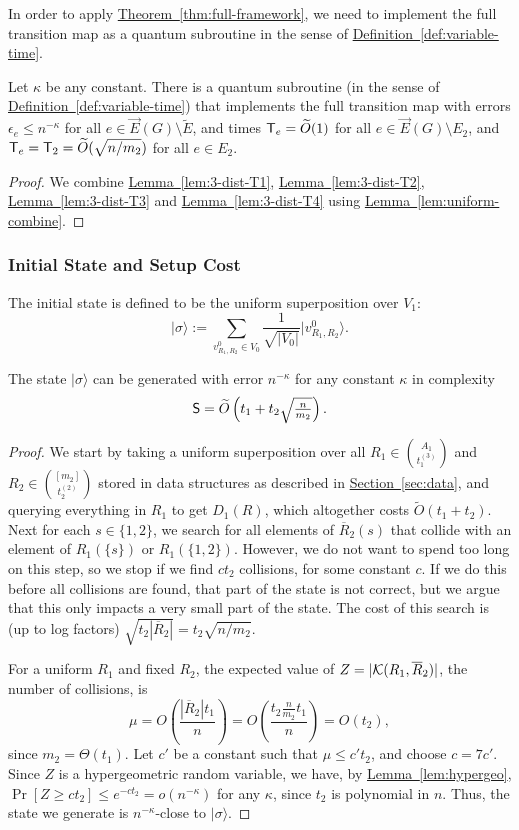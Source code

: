 \documentclass{theoretics}
\renewcommand{\sec}[1]{\hyperref[sec:#1]{Section~\ref*{sec:#1}}}
\newcommand{\thm}[1]{\hyperref[thm:#1]{Theorem~\ref*{thm:#1}}}
\newcommand{\lem}[1]{\hyperref[lem:#1]{Lemma~\ref*{lem:#1}}}
\newcommand{\defin}[1]{\hyperref[def:#1]{Definition~\ref*{def:#1}}}
\def\ket#1{{\lvert}#1\rangle}
\renewcommand{\>}{\rangle}
\newcommand{\<}{\langle}
\renewcommand{\(}{\left(}
\renewcommand{\)}{\right)}
\begin{document}
In order to apply \thm{full-framework}, we need to implement the full transition map as a quantum subroutine in the sense of \defin{variable-time}.
\begin{corollary}\label{cor:3-dist-transitions}
Let $\kappa$ be any constant. 
There is a quantum subroutine (in the sense of \defin{variable-time}) that implements the full transition map with errors $\epsilon_e\leq n^{-\kappa}$ for all $e\in \overrightarrow{E}(G)\setminus\tilde{E}$, and times ${\sf T}_e=\widetilde{O}(1)$ for all $e\in \overrightarrow{E}(G)\setminus E_2$, and ${\sf T}_e={\sf T}_2=\widetilde{O}(\sqrt{n/m_2})$ for all $e\in E_2$. 
\end{corollary}
\begin{proof}
We combine \lem{3-dist-T1}, \lem{3-dist-T2}, \lem{3-dist-T3} and \lem{3-dist-T4} using  \lem{uniform-combine}.
\end{proof}

\subsubsection{Initial State and Setup Cost}


The initial state is defined to be the uniform superposition over $V_1$: 
\begin{equation*}
\ket{\sigma} := \sum_{v^0_{R_1,R_2}\in V_0}\frac{1}{\sqrt{|V_0|}}\ket{v^0_{R_1,R_2}}.
\end{equation*}

\begin{lemma}\label{lem:setup}
The state $\ket{\sigma}$ can be generated with error $n^{-\kappa}$ for any constant $\kappa$ in complexity 
$$\textstyle{\sf S}=\widetilde{O}\left(t_1+t_2\sqrt{\frac{n}{m_2}}\right).$$
\end{lemma}
\begin{proof}
We start by taking a uniform superposition over all $R_1\in \binom{A_1}{t_1^{(3)}}$ and $R_2\in \binom{[m_2]}{t_2^{(2)}}$ stored in data structures as described in \sec{data}, and querying everything in $R_1$ to get $D_1(R)$, which altogether costs $\widetilde{O}(t_1+t_2)$. Next for each $s\in\{1,2\}$, we search for all elements of $\overline{R}_2(s)$ that collide with an element of $R_1(\{s\})$ or $R_1(\{1,2\})$. However, we do not want to spend too long on this step, so we stop if we find $ct_2$ collisions, for some constant $c$. If we do this before all collisions are found, that part of the state is not correct, but we argue that this only impacts a very small part of the state. The cost of this search is (up to log factors) $\sqrt{t_2|\overline{R}_2|}=t_2\sqrt{n/m_2}$. 

For a uniform $R_1$ and fixed $R_2$, the expected value of $Z=|{\cal K}({R}_1,\overline{R}_2)|$, the number of collisions, is 
$$\mu=O\left(\frac{|\overline{R}_2| t_1}{n}\right) = O\left(\frac{t_2\frac{n}{m_2}  t_1}{n}\right)=O(t_2),$$
since $m_2=\Theta(t_1)$. Let $c'$ be a constant such that $\mu\leq c't_2$, and choose $c=7c'$.
Since $Z$ is a hypergeometric random variable, we have, by \lem{hypergeo}, 
$\Pr[Z\geq ct_2] \leq e^{-ct_2} = o( n^{-\kappa})$
for any $\kappa$, since $t_2$ is polynomial in $n$. Thus, the state we generate is $n^{-\kappa}$-close to $\ket{\sigma}$. 
\end{proof}
\end{document}
